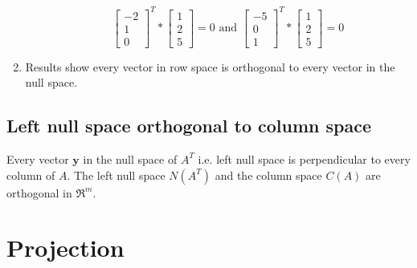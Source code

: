 \documentclass[10pt,a4paper]{article}
\begin{document}
\begin{enumerate}
\begin{itemize}
		\begin{equation*} 
			\begin{bmatrix}
				-2 \\
				1 \\
				0
				\end{bmatrix}^T*\begin{bmatrix}
					1 \\
					2 \\
					5
					\end{bmatrix}=0\textrm{ and } \begin{bmatrix}
					-5 \\
					0 \\
					1
					\end{bmatrix}^T*\begin{bmatrix}
						1 \\
						2 \\
						5
						\end{bmatrix} = 0
		\end{equation*} 
	\end{itemize}
	\item Results show every vector in row space is orthogonal to every vector in the null space.
\end{enumerate}

\subsection{Left null space orthogonal to column space}

\begin{tcolorbox}[breakable,colback=white]
	Every vector $\textbf{y}$ in the null space of $A^T$ i.e. left null space is perpendicular to
	every column of $A$. The left null space $N(A^T)$ and the column space $C(A)$ are orthogonal in
	$\Re^m$.
\end{tcolorbox}

\section{Projection}
\end{document}

